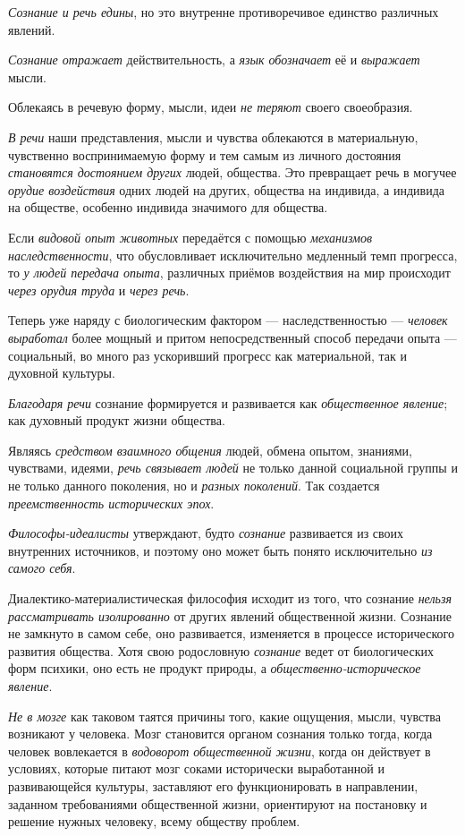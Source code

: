 \documentclass[a4paper,14pt,russian]{extreport}
\begin{document}
\emph{Сознание и речь едины}, но это внутренне противоречивое единство различных явлений.

\emph{Сознание отражает} действительность, а \emph{язык обозначает} её и \emph{выражает} мысли.

Облекаясь в речевую форму, мысли, идеи \emph{не теряют} своего своеобразия.

\emph{В речи} наши представления, мысли и чувства облекаются в материальную, чувственно воспринимаемую форму и тем самым из личного достояния \emph{становятся достоянием других} людей, общества. Это превращает речь в могучее \emph{орудие воздействия} одних людей на других, общества на индивида, а индивида на обществе, особенно индивида значимого для общества.

Если \emph{видовой опыт животных} передаётся с помощью \emph{механизмов наследственности}, что обусловливает исключительно медленный темп прогресса, то \emph{у людей передача опыта}, различных приёмов воздействия на мир происходит \emph{через орудия труда} и \emph{через речь}.

Теперь уже наряду с биологическим фактором --- наследственностью --- \emph{человек выработал} более мощный и притом непосредственный способ передачи опыта --- социальный, во много раз ускоривший прогресс как материальной, так и духовной культуры.

\emph{Благодаря речи} сознание формируется и развивается как \emph{общественное явление}; как духовный продукт жизни общества.

Являясь \emph{средством взаимного общения} людей, обмена опытом, знаниями, чувствами, идеями, \emph{речь связывает людей} не только данной социальной группы и не только данного поколения, но и \emph{разных поколений}. Так создается \emph{преемственность исторических эпох}.

\emph{Философы-идеалисты} утверждают, будто \emph{сознание} развивается из своих внутренних источников, и поэтому оно может быть понято исключительно \emph{из самого себя}.

Диалектико-материалистическая философия исходит из того, что сознание \emph{нельзя рассматривать изолированно} от других явлений общественной жизни. Сознание не замкнуто в самом себе, оно развивается, изменяется в процессе исторического развития общества. Хотя свою родословную \emph{сознание} ведет от биологических форм психики, оно есть не продукт природы, а \emph{общественно-историческое явление}.

\emph{Не в мозге} как таковом таятся причины того, какие ощущения, мысли, чувства возникают у человека. Мозг становится органом сознания только тогда, когда человек вовлекается в \emph{водоворот общественной жизни}, когда он действует в условиях, которые питают мозг соками исторически выработанной и развивающейся культуры, заставляют его функционировать в направлении, заданном требованиями общественной жизни, ориентируют на постановку и решение нужных человеку, всему обществу проблем.
\end{document}
